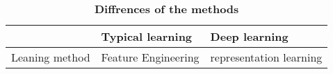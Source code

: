 \documentclass[35pt]{article}
\begin{document}
 \begin{table}[!htbp]
  \centering
 \begin{tabular}{|p{3cm}|p{3cm}|p{3cm}|}
    \hline
      & Typical learning & Deep learning\\
    \hline
    Leaning method & Feature Engineering & representation learning\\
    \hline
  \end{tabular}
  \caption{\textbf{Diffrences of the methods}} \label{Table1}
  \end{table}
  

\end{document}
